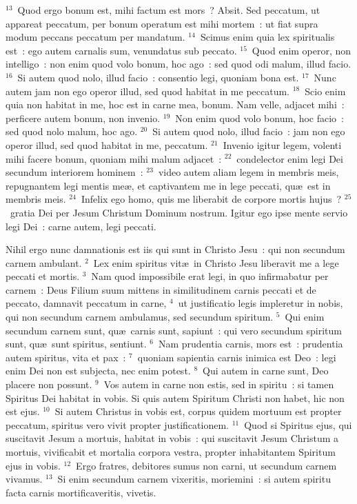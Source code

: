${}^{13}$~Quod ergo bonum est, mihi factum est mors~? Absit. Sed peccatum, ut appareat peccatum, per bonum operatum est mihi mortem~: ut fiat supra modum peccans peccatum per mandatum.
${}^{14}$~Scimus enim quia lex spiritualis est~: ego autem carnalis sum, venundatus sub peccato.
${}^{15}$~Quod enim operor, non intelligo~: non enim quod volo bonum, hoc ago~: sed quod odi malum, illud facio.
${}^{16}$~Si autem quod nolo, illud facio~: consentio legi, quoniam bona est.
${}^{17}$~Nunc autem jam non ego operor illud, sed quod habitat in me peccatum.
${}^{18}$~Scio enim quia non habitat in me, hoc est in carne mea, bonum. Nam velle, adjacet mihi~: perficere autem bonum, non invenio.
${}^{19}$~Non enim quod volo bonum, hoc facio~: sed quod nolo malum, hoc ago.
${}^{20}$~Si autem quod nolo, illud facio~: jam non ego operor illud, sed quod habitat in me, peccatum.
${}^{21}$~Invenio igitur legem, volenti mihi facere bonum, quoniam mihi malum adjacet~:
${}^{22}$~condelector enim legi Dei secundum interiorem hominem~:
${}^{23}$~video autem aliam legem in membris meis, repugnantem legi mentis me\ae , et captivantem me in lege peccati, qu\ae\ est in membris meis.
${}^{24}$~Infelix ego homo, quis me liberabit de corpore mortis hujus~?
${}^{25}$~gratia Dei per Jesum Christum Dominum nostrum. Igitur ego ipse mente servio legi Dei~: carne autem, legi peccati.

\lettrine[lines=3,image=true,loversize=0.05,lraise=-0.03]{N}{}ihil ergo nunc damnationis est iis qui sunt in Christo Jesu~: qui non secundum carnem ambulant.
${}^{2}$~Lex enim spiritus vit\ae\ in Christo Jesu liberavit me a lege peccati et mortis.
${}^{3}$~Nam quod impossibile erat legi, in quo infirmabatur per carnem~: Deus Filium suum mittens in similitudinem carnis peccati et de peccato, damnavit peccatum in carne,
${}^{4}$~ut justificatio legis impleretur in nobis, qui non secundum carnem ambulamus, sed secundum spiritum.
${}^{5}$~Qui enim secundum carnem sunt, qu\ae\ carnis sunt, sapiunt~: qui vero secundum spiritum sunt, qu\ae\ sunt spiritus, sentiunt.
${}^{6}$~Nam prudentia carnis, mors est~: prudentia autem spiritus, vita et pax~:
${}^{7}$~quoniam sapientia carnis inimica est Deo~: legi enim Dei non est subjecta, nec enim potest.
${}^{8}$~Qui autem in carne sunt, Deo placere non possunt.
${}^{9}$~Vos autem in carne non estis, sed in spiritu~: si tamen Spiritus Dei habitat in vobis. Si quis autem Spiritum Christi non habet, hic non est ejus.
${}^{10}$~Si autem Christus in vobis est, corpus quidem mortuum est propter peccatum, spiritus vero vivit propter justificationem.
${}^{11}$~Quod si Spiritus ejus, qui suscitavit Jesum a mortuis, habitat in vobis~: qui suscitavit Jesum Christum a mortuis, vivificabit et mortalia corpora vestra, propter inhabitantem Spiritum ejus in vobis.
${}^{12}$~Ergo fratres, debitores sumus non carni, ut secundum carnem vivamus.
${}^{13}$~Si enim secundum carnem vixeritis, moriemini~: si autem spiritu facta carnis mortificaveritis, vivetis.


